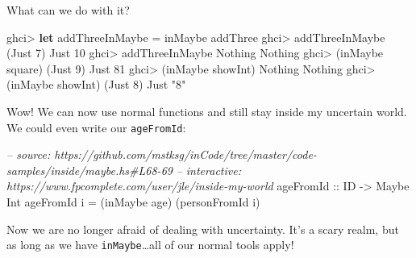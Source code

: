 \documentclass[]{article}
\newenvironment{Shaded}{\begin{snugshade}}{\end{snugshade}}
\newcommand{\CommentTok}[1]{\textcolor[rgb]{0.56,0.35,0.01}{\textit{#1}}}
\newcommand{\DataTypeTok}[1]{\textcolor[rgb]{0.13,0.29,0.53}{#1}}
\newcommand{\DecValTok}[1]{\textcolor[rgb]{0.00,0.00,0.81}{#1}}
\newcommand{\FunctionTok}[1]{\textcolor[rgb]{0.00,0.00,0.00}{#1}}
\newcommand{\KeywordTok}[1]{\textcolor[rgb]{0.13,0.29,0.53}{\textbf{#1}}}
\newcommand{\NormalTok}[1]{#1}
\newcommand{\OtherTok}[1]{\textcolor[rgb]{0.56,0.35,0.01}{#1}}
\newcommand{\StringTok}[1]{\textcolor[rgb]{0.31,0.60,0.02}{#1}}
\begin{document}
What can we do with it?

\begin{Shaded}
\begin{Highlighting}[]
\NormalTok{ghci}\FunctionTok{>} \KeywordTok{let}\NormalTok{ addThreeInMaybe }\FunctionTok{=}\NormalTok{ inMaybe addThree}
\NormalTok{ghci}\FunctionTok{>}\NormalTok{ addThreeInMaybe (}\DataTypeTok{Just} \DecValTok{7}\NormalTok{)}
\DataTypeTok{Just} \DecValTok{10}
\NormalTok{ghci}\FunctionTok{>}\NormalTok{ addThreeInMaybe }\DataTypeTok{Nothing}
\DataTypeTok{Nothing}
\NormalTok{ghci}\FunctionTok{>}\NormalTok{ (inMaybe square) (}\DataTypeTok{Just} \DecValTok{9}\NormalTok{)}
\DataTypeTok{Just} \DecValTok{81}
\NormalTok{ghci}\FunctionTok{>}\NormalTok{ (inMaybe showInt) }\DataTypeTok{Nothing}
\DataTypeTok{Nothing}
\NormalTok{ghci}\FunctionTok{>}\NormalTok{ (inMaybe showInt) (}\DataTypeTok{Just} \DecValTok{8}\NormalTok{)}
\DataTypeTok{Just} \StringTok{"8"}
\end{Highlighting}
\end{Shaded}

Wow! We can now use normal functions and still stay inside my uncertain world.
We could even write our \texttt{ageFromId}:

\begin{Shaded}
\begin{Highlighting}[]
\CommentTok{-- source: https://github.com/mstksg/inCode/tree/master/code-samples/inside/maybe.hs#L68-69}
\CommentTok{-- interactive: https://www.fpcomplete.com/user/jle/inside-my-world}
\OtherTok{ageFromId ::} \DataTypeTok{ID} \OtherTok{->} \DataTypeTok{Maybe} \DataTypeTok{Int}
\NormalTok{ageFromId i }\FunctionTok{=}\NormalTok{ (inMaybe age) (personFromId i)}
\end{Highlighting}
\end{Shaded}

Now we are no longer afraid of dealing with uncertainty. It's a scary realm, but
as long as we have \texttt{inMaybe}\ldots{}all of our normal tools apply!
\end{document}
